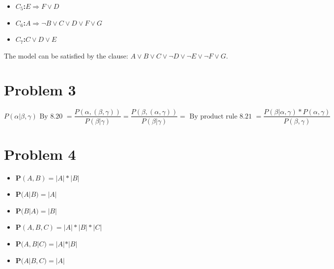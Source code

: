 \documentclass{article}
\begin{document}
\begin{itemize}

\item{{\bf $C_5$:}$E \Rightarrow F \vee D$}
\item{{\bf $C_6$:}$A \Rightarrow \neg B \vee C \vee D \vee F \vee G$}
\item{{\bf $C_7$:}$C \vee D \vee E$}

\end{itemize}

The model can be satisfied by the clause: $A \vee B \vee C \vee \neg D \vee \neg E \vee \neg F \vee G$.

\section{Problem 3}

\[
P(\alpha|\beta,\gamma) \text{ By 8.20 }=\frac{P(\alpha,(\beta,\gamma))}{P(\beta|\gamma)}=\frac{P(\beta,(\alpha,\gamma))}{P(\beta|\gamma)}
= \text{ By product rule 8.21 } = \frac{P(\beta|\alpha,\gamma)*P(\alpha,\gamma)}{P(\beta,\gamma)}
\]

\section{Problem 4}

\begin{itemize}

\item{{\bf P}$(A,B)=|A|*|B|$}
\item{{\bf P}$(A|B)=|A|$}
\item{{\bf P}$(B|A)=|B|$}
\item{{\bf P}$(A,B,C)=|A|*|B|*|C|$}
\item{{\bf P}$(A,B|C)=|A|*|B|$}
\item{{\bf P}$(A|B,C)=|A|$}

\end{itemize}
\end{document}
